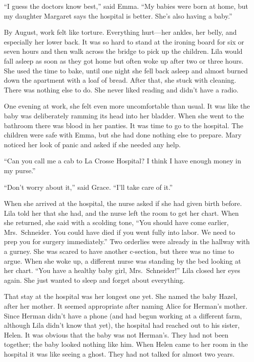 \documentclass[
  american,
  letterpaper,
]{book}
\begin{document}
``I guess the doctors know best,'' said Emma. ``My babies were born at
home, but my daughter Margaret says the hospital is better. She's also
having a baby.''

By August, work felt like torture. Everything hurt---her ankles, her
belly, and especially her lower back. It was so hard to stand at the
ironing board for six or seven hours and then walk across the bridge to
pick up the children. Lila would fall asleep as soon as they got home
but often woke up after two or three hours. She used the time to bake,
until one night she fell back asleep and almost burned down the
apartment with a loaf of bread. After that, she stuck with cleaning.
There was nothing else to do. She never liked reading and didn't have a
radio.

One evening at work, she felt even more uncomfortable than usual. It was
like the baby was deliberately ramming its head into her bladder. When
she went to the bathroom there was blood in her panties. It was time to
go to the hospital. The children were safe with Emma, but she had done
nothing else to prepare. Mary noticed her look of panic and asked if she
needed any help.

``Can you call me a cab to La Crosse Hospital? I think I have enough
money in my purse.''

``Don't worry about it,'' said Grace. ``I'll take care of it.''

When she arrived at the hospital, the nurse asked if she had given birth
before. Lila told her that she had, and the nurse left the room to get
her chart. When she returned, she said with a scolding tone, ``You
should have come earlier, Mrs.~Schneider. You could have died if you
went fully into labor. We need to prep you for surgery immediately.''
Two orderlies were already in the hallway with a gurney. She was scared
to have another c-section, but there was no time to argue. When she woke
up, a different nurse was standing by the bed looking at her chart.
``You have a healthy baby girl, Mrs.~Schneider!'' Lila closed her eyes
again. She just wanted to sleep and forget about everything.

That stay at the hospital was her longest one yet. She named the baby
Hazel, after her mother. It seemed appropriate after naming Alice for
Herman's mother. Since Herman didn't have a phone (and had begun working
at a different farm, although Lila didn't know that yet), the hospital
had reached out to his sister, Helen. It was obvious that the baby was
not Herman's. They had not been together; the baby looked nothing like
him. When Helen came to her room in the hospital it was like seeing a
ghost. They had not talked for almost two years.
\end{document}
